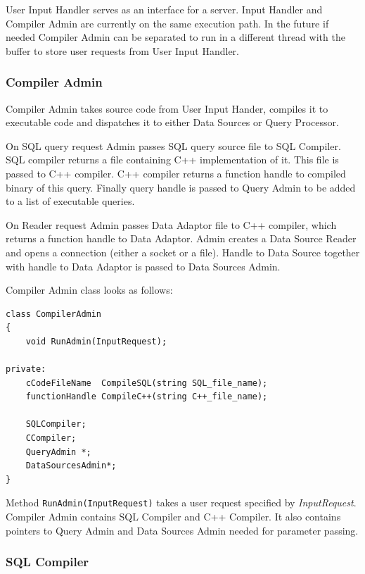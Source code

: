 \documentclass[14pt]{article}
\begin{document}
User Input Handler serves as an interface for a server. Input Handler and Compiler Admin are currently on the same execution path. In the future if needed Compiler Admin can be separated to run in a different thread with the buffer to store user requests from User Input Handler. 

\subsubsection{Compiler Admin}

Compiler Admin takes source code from User Input Hander, compiles it to executable code and dispatches it to either Data Sources or Query Processor. 

On SQL query request Admin passes SQL query source file to SQL Compiler. SQL compiler returns a file containing C++ implementation of it. This file is passed to C++ compiler. C++ compiler returns a function handle to compiled binary of this query. Finally query handle is passed to Query Admin to be added to a list of executable queries.

On Reader request Admin passes Data Adaptor file to C++ compiler, which returns a function handle to Data Adaptor. Admin creates a Data Source Reader and opens a connection (either a socket or a file). Handle to Data Source together with handle to Data Adaptor is passed to Data Sources Admin.

\noindent Compiler Admin class looks as follows:
\begin{verbatim}
class CompilerAdmin
{
    void RunAdmin(InputRequest);

private:
    cCodeFileName  CompileSQL(string SQL_file_name);
    functionHandle CompileC++(string C++_file_name);
	
    SQLCompiler;
    CCompiler;
    QueryAdmin *;
    DataSourcesAdmin*;
}
\end{verbatim}

Method {\tt RunAdmin(InputRequest)} takes a user request specified by \emph{InputRequest}. Compiler Admin contains SQL Compiler and C++ Compiler. It also contains pointers to Query Admin and Data Sources Admin needed for parameter passing.

\subsubsection{SQL Compiler}
\end{document}
